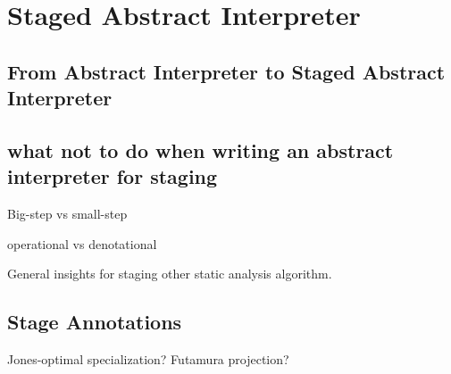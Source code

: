 \section{Staged Abstract Interpreter}

\subsection{From Abstract Interpreter to Staged Abstract Interpreter}

\subsection{what not to do when writing an abstract interpreter for staging}

Big-step vs small-step

operational vs denotational

General insights for staging other static analysis algorithm.

\cite{10.1007/3-540-61580-6_11}

\subsection{Stage Annotations}

Jones-optimal specialization?
Futamura projection?
